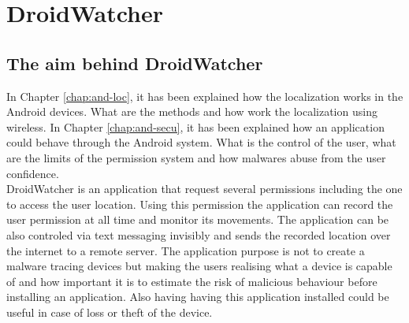
\chapter{DroidWatcher}
\label{chap:droidwatcher}




\section{The aim behind DroidWatcher}

In Chapter \ref{chap:and-loc}, it has been explained how the localization works in the Android devices.
What are the methods and how work the localization using wireless.
In Chapter \ref{chap:and-secu}, it has been explained how an application could behave through the Android system.
What is the control of the user, what are the limits of the permission system and how malwares abuse from the user confidence.\\

DroidWatcher is an application that request several permissions including the one to access the user location.
Using this permission the application can record the user permission at all time and monitor its movements.
The application can be also controled via text messaging invisibly and sends the recorded location over the internet to a remote server.
The application purpose is not to create a malware tracing devices but making the users realising what a device is capable of and how important it is to estimate the risk of malicious behaviour before installing an application.
Also having having this application installed could be useful in case of loss or theft of the device.\\

